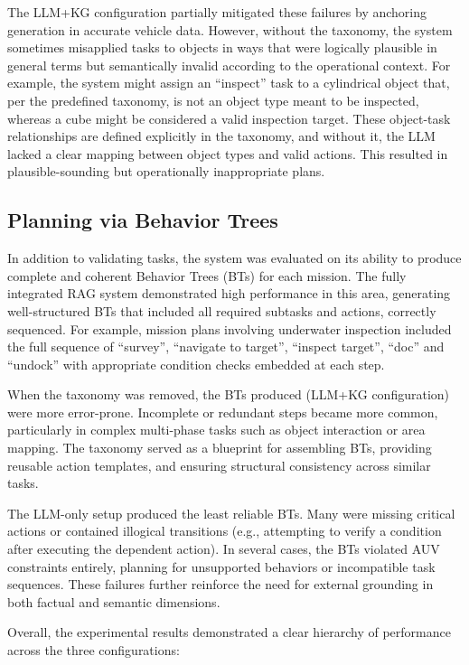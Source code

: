 The LLM+KG configuration partially mitigated these failures by anchoring generation in accurate vehicle data. However, without the taxonomy, the system sometimes misapplied tasks to objects in ways that were logically plausible in general terms but semantically invalid according to the operational context. For example, the system might assign an ``inspect'' task to a cylindrical object that, per the predefined taxonomy, is not an object type meant to be inspected, whereas a cube might be considered a valid inspection target. These object-task relationships are defined explicitly in the taxonomy, and without it, the LLM lacked a clear mapping between object types and valid actions. This resulted in plausible-sounding but operationally inappropriate plans. 

\subsection{Planning via Behavior Trees}
In addition to validating tasks, the system was evaluated on its ability to produce complete and coherent Behavior Trees (BTs) for each mission. The fully integrated RAG system demonstrated high performance in this area, generating well-structured BTs that included all required subtasks and actions, correctly sequenced. For example, mission plans involving underwater inspection included the full sequence of ``survey'', ``navigate to target'', ``inspect target'', ``doc'' and ``undock'' with appropriate condition checks embedded at each step.

When the taxonomy was removed, the BTs produced (LLM+KG configuration) were more error-prone. Incomplete or redundant steps became more common, particularly in complex multi-phase tasks such as object interaction or area mapping. The taxonomy served as a blueprint for assembling BTs, providing reusable action templates, and ensuring structural consistency across similar tasks.

The LLM-only setup produced the least reliable BTs. Many were missing critical actions or contained illogical transitions (e.g., attempting to verify a condition after executing the dependent action). In several cases, the BTs violated AUV constraints entirely, planning for unsupported behaviors or incompatible task sequences. These failures further reinforce the need for external grounding in both factual and semantic dimensions.

Overall, the experimental results demonstrated a clear hierarchy of performance across the three configurations:

